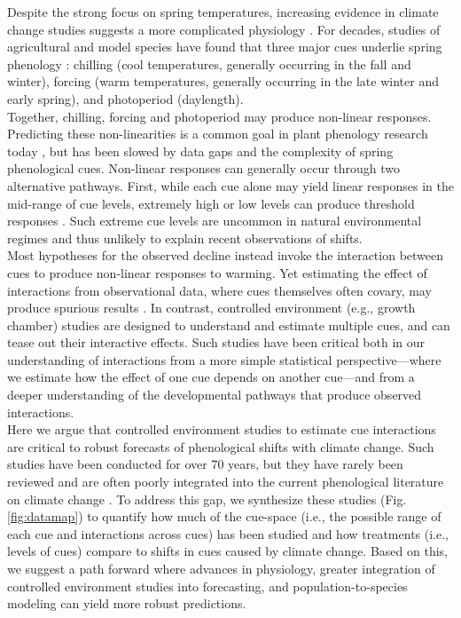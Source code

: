 \documentclass[11pt,letter]{article}
\begin{document}
Despite the strong focus on spring temperatures, increasing evidence in climate change studies suggests a more complicated physiology \citep[e.g.,][]{zohner2016,gauzere2019,ettinger2020}. For decades, studies of agricultural and model species have found that three major cues underlie spring phenology \citep{Maurya2017,Satake2022}: chilling (cool temperatures, generally occurring in the fall and winter), forcing (warm temperatures, generally occurring in the late winter and early spring), and photoperiod (daylength). \\ %

Together, chilling, forcing and photoperiod may produce non-linear responses. Predicting these non-linearities is a common goal in plant phenology research today \citep{gusewell2017,chen2019}, but has been slowed by data gaps and the complexity of spring phenological cues. Non-linear responses can generally occur through two alternative pathways. First, while each cue alone may yield linear responses in the mid-range of cue levels, extremely high or low levels can produce threshold responses \citep{Heide:1993,Partanen:1998aa,Singh:2017,rinne2018}. Such extreme cue levels are uncommon in natural environmental regimes and thus unlikely to explain recent observations of shifts. \\

Most hypotheses for the observed decline instead invoke the interaction between cues to produce non-linear responses to warming. Yet estimating the effect of interactions from observational data, where cues themselves often covary, may produce spurious results \citep{ettinger2020}. In contrast, controlled environment (e.g., growth chamber) studies are designed to understand and estimate multiple cues, and can tease out their interactive effects. Such studies have been critical both in our understanding of interactions from a more simple statistical perspective---where we estimate how the effect of one cue depends on another cue---and from a deeper understanding of the developmental pathways that produce observed interactions. \\ %

Here we argue that controlled environment  studies to estimate cue interactions are critical to robust forecasts of phenological shifts with climate change. Such studies have been conducted for over 70 years, but they have rarely been reviewed and are often poorly integrated into the current phenological literature on climate change \citep[e.g.,][]{fu2015,richardson2018}. To address this gap, we synthesize these studies (Fig. \ref{fig:datamap}) to quantify how much of the cue-space (i.e., the possible range of each cue and interactions across cues) has been studied and how treatments (i.e., levels of cues) compare to shifts in cues caused by climate change. Based on this, we suggest a path forward where advances in physiology, greater integration of controlled environment studies into  forecasting, and population-to-species modeling can yield more robust predictions.\\ 
\end{document}
